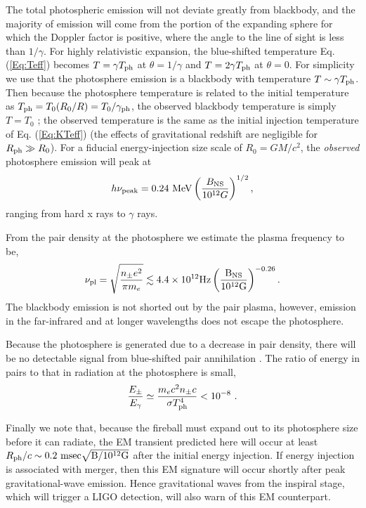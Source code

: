 The total photospheric emission will not deviate greatly from
blackbody, and the majority of emission will come from the portion of
the expanding sphere for which the Doppler factor is positive, where
the angle to the line of sight is less than $1/\gamma$. For highly
relativistic expansion, the blue-shifted temperature
Eq. (\ref{Eq:Teff}) becomes $T = \gamma T_{\rm{ph}}$ at
$\theta=1/\gamma$ and $T = 2 \gamma T_{\rm{ph}}$ at $\theta=0$. For
simplicity we use that the photosphere emission is a blackbody with
temperature $T \sim \gamma T_{\rm{ph}}$. Then because the photosphere
temperature is related to the initial temperature as $T_{\rm ph} =
T_0(R_0/R) = T_0/\gamma_{\rm{ph}}$, the observed blackbody temperature
is simply $T=T_0$ \citep[{\em see also}][]{Pacz:1986GRB}; the observed
temperature is the same as the initial injection temperature of
Eq. (\ref{Eq:KTeff}) (the effects of gravitational redshift are
negligible for $R_{\rm ph}\gg R_0$). For a fiducial energy-injection
size scale of $R_0 = GM/c^2$, the {\em observed} photosphere emission
will peak at
\begin{align}
h \nu_{\rm{peak}} = 0.24 \ \mbox{MeV} \left( \frac{B_{\rm NS}}{10^{12} G} \right)^{1/2} ,
\label{Eq:KTWein}
\end{align}
ranging from hard x rays to $\gamma$ rays.

From the pair density at the photosphere we estimate the plasma
frequency to be,
\begin{align}
\nu_{\rm pl} = \sqrt{\frac{ n_{\pm} e^2}{\pi m_e}} \lesssim 4.4 \times 10^{12} \rm{Hz}   \left( \frac{B_{\rm NS}}{10^{12} \rm{G}}\right)^{-0.26} .
\end{align}
The blackbody emission is not shorted out by the pair plasma, however,
emission in the far-infrared and at longer wavelengths does not escape
the photosphere.




Because the photosphere is generated due to a decrease in pair
density, there will be no detectable signal from blue-shifted pair
annihilation \citep[{\em see also}][]{Pacz:1986GRB,
  GoodmanGRB:1986}. The ratio of energy in pairs to that in radiation
at the photosphere is small,
\begin{align}
\frac{E_{\pm}}{E_{\gamma}} \simeq \frac{m_e c^2 n_{\pm} c}{\sigma T_{\rm{ph}}^4} < 10^{-8} \ .
\end{align}


Finally we note that, because the fireball must expand out to its
photosphere size before it can radiate, the EM transient predicted
here will occur at least $R_{\rm{ph}}/c \sim 0.2 \ \rm{msec}
\sqrt{B/10^{12}\rm{G}}$ after the initial energy injection. If energy
injection is associated with merger, then this EM signature will occur
shortly after peak gravitational-wave emission.  Hence gravitational 
waves from the inspiral stage, which will trigger a LIGO detection, 
will also warn of this EM counterpart.


